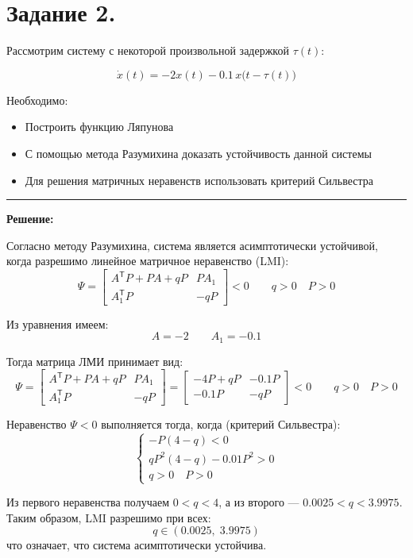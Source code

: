 \documentclass[a4paper,12pt]{article}
\begin{document}
	\newpage
	\section{Задание 2.}
	
	Рассмотрим систему с некоторой произвольной задержкой \(\tau(t)\):
	
	\[\dot{x}(t) = -2x(t) - 0.1\, x\bigl(t - \tau(t)\bigr)\]
	


	Необходимо: 
	\begin{itemize}
		\item Построить функцию Ляпунова
		\item С помощью метода Разумихина доказать устойчивость данной системы
		\item Для решения матричных неравенств использовать критерий Сильвестра
	\end{itemize}
	
	\hrule
	\[\]	
	\textbf{Решение: } 
	
	Согласно методу Разумихина, система является асимптотически устойчивой,
	когда разрешимо линейное матричное неравенство (LMI):
	\[
	\Psi =
	\begin{bmatrix}
		A^{\mathsf T} P + P A + qP & P A_1 \\
		A_1^{\mathsf T} P & -q P
	\end{bmatrix}
	< 0
	\qquad q > 0 \quad P > 0
	\]
	
	Из уравнения имеем: 
	\[
	A = -2 \qquad A_1 = -0.1
	\]
	
	Тогда матрица ЛМИ принимает вид:
	\[
	\Psi =
	\begin{bmatrix}
		A^{\mathsf T} P + P A + qP & P A_1 \\
		A_1^{\mathsf T} P & -qP
	\end{bmatrix}
	=
	\begin{bmatrix}
		-4P + qP & -0.1P \\
		-0.1P & -qP
	\end{bmatrix}
	< 0
	\qquad q>0 \quad P>0
	\]
	
	Неравенство \(\Psi < 0\) выполняется тогда, когда (критерий Сильвестра):
	\[
	\begin{cases}
		-P(4 - q) < 0\\
		qP^{2}(4 - q) - 0.01 P^{2} > 0\\
		q > 0 \quad P > 0
	\end{cases}
	\]
	
	Из первого неравенства получаем \(0 < q < 4\), 
	а из второго — \(0.0025 < q < 3.9975\).
	Таким образом, LMI разрешимо при всех:
	\[
	q \in (0.0025,\;3.9975)
	\]
	что означает, что система асимптотически устойчива.
	
\end{document}

